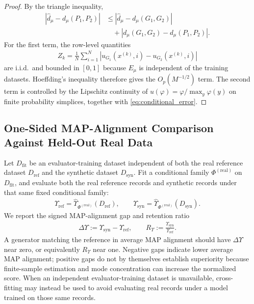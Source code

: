 \documentclass[runningheads]{llncs}
\def\EQSP{3pt}
\newcommand{\cgather}[2][\EQSP]{\begingroup\setlength\abovedisplayskip{#1}\setlength\belowdisplayskip{#1}\begin{gather} #2 \end{gather}\endgroup\noindent}
\newcommand{\calign}[2][\EQSP]{\begingroup\setlength\abovedisplayskip{#1}\setlength\belowdisplayskip{#1}\begin{align} #2 \end{align}\endgroup\noindent}
\begin{document}
\begin{proof}
By the triangle inequality,
\calign{
\left\lvert \widehat d_{\mu}-d_{\mu}(P_1,P_2)\right\rvert
&\leq
\left\lvert \widehat d_{\mu}-d_{\mu}(G_1,G_2)\right\rvert\\
&\quad+
\left\lvert d_{\mu}(G_1,G_2)-d_{\mu}(P_1,P_2)\right\rvert.
}
For the first term, the row-level quantities
\cgather{
Z_k=\frac{1}{N}\sum_{i=1}^{N}
\left\lvert u_{G_1}(x^{(k)},i)-u_{G_2}(x^{(k)},i)\right\rvert
}
are i.i.d.\ and bounded in $[0,1]$ because $E_{\mu}$ is independent of the
training datasets. Hoeffding's inequality therefore gives the
$O_p(M^{-1/2})$ term. The second term is controlled by the Lipschitz
continuity of $u(\varphi)=\varphi/\max_y\varphi(y)$ on finite
probability simplices, together with \eqref{eq:conditional_error}.
\end{proof}
\subsection{One-Sided MAP-Alignment Comparison Against Held-Out Real Data}

Let $D_{\mathrm{fit}}$ be an evaluator-training dataset independent of both
the real reference dataset $D_{\mathrm{ref}}$ and the synthetic dataset
$D_{\mathrm{syn}}$. Fit a conditional family $\Phi^{(\mathrm{real})}$ on
$D_{\mathrm{fit}}$, and evaluate both the real reference records and synthetic
records under that same fixed conditional family:
\cgather{
\Upsilon_{\mathrm{ref}}
=\hat\Upsilon_{\Phi^{(\mathrm{real})}}(D_{\mathrm{ref}}),
\qquad
\Upsilon_{\mathrm{syn}}
=\hat\Upsilon_{\Phi^{(\mathrm{real})}}(D_{\mathrm{syn}}).
}
We report the signed MAP-alignment gap and retention ratio
\cgather{
\Delta\Upsilon:=\Upsilon_{\mathrm{syn}}-\Upsilon_{\mathrm{ref}},
\qquad
R_{\Upsilon}:=\frac{\Upsilon_{\mathrm{syn}}}{\Upsilon_{\mathrm{ref}}}.
\label{eq:fidelity_gap_retention}
}
A generator matching the reference in average MAP alignment should have
$\Delta\Upsilon$ near zero, or equivalently $R_{\Upsilon}$ near one. Negative
gaps indicate lower average MAP alignment;
positive gaps do not by themselves establish superiority because finite-sample
estimation and mode concentration can increase the normalized score. When an
independent evaluator-training dataset is unavailable, cross-fitting may instead
be used to avoid evaluating real records under a model trained on those same
records.
\end{document}
